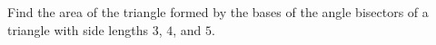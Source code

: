 Find the area of the triangle formed by the bases of the angle bisectors of a triangle with side lengths $3$, $4$, and $5$.
